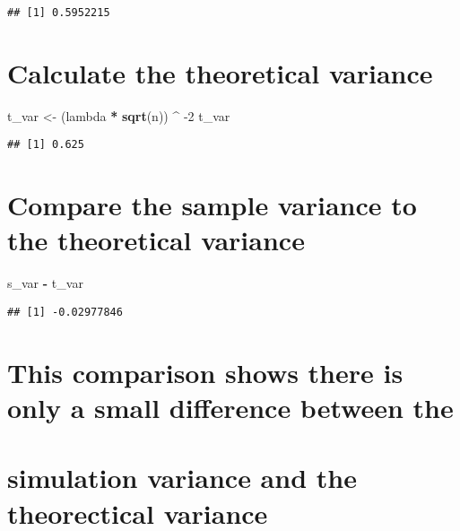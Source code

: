 \documentclass[
]{article}
\newenvironment{Shaded}{\begin{snugshade}}{\end{snugshade}}
\newcommand{\DecValTok}[1]{\textcolor[rgb]{0.00,0.00,0.81}{#1}}
\newcommand{\KeywordTok}[1]{\textcolor[rgb]{0.13,0.29,0.53}{\textbf{#1}}}
\newcommand{\NormalTok}[1]{#1}
\newcommand{\OperatorTok}[1]{\textcolor[rgb]{0.81,0.36,0.00}{\textbf{#1}}}
\newcommand{\StringTok}[1]{\textcolor[rgb]{0.31,0.60,0.02}{#1}}
\begin{document}
\begin{verbatim}
## [1] 0.5952215
\end{verbatim}

\hypertarget{calculate-the-theoretical-variance}{%
\section{Calculate the theoretical
variance}\label{calculate-the-theoretical-variance}}

\begin{Shaded}
\begin{Highlighting}[]
\NormalTok{t_var <-}\StringTok{ }\NormalTok{(lambda }\OperatorTok{*}\StringTok{ }\KeywordTok{sqrt}\NormalTok{(n)) }\OperatorTok{^}\StringTok{ }\DecValTok{-2}
\NormalTok{t_var}
\end{Highlighting}
\end{Shaded}

\begin{verbatim}
## [1] 0.625
\end{verbatim}

\hypertarget{compare-the-sample-variance-to-the-theoretical-variance}{%
\section{Compare the sample variance to the theoretical
variance}\label{compare-the-sample-variance-to-the-theoretical-variance}}

\begin{Shaded}
\begin{Highlighting}[]
\NormalTok{s_var }\OperatorTok{-}\StringTok{ }\NormalTok{t_var}
\end{Highlighting}
\end{Shaded}

\begin{verbatim}
## [1] -0.02977846
\end{verbatim}

\hypertarget{this-comparison-shows-there-is-only-a-small-difference-between-the}{%
\section{This comparison shows there is only a small difference between
the}\label{this-comparison-shows-there-is-only-a-small-difference-between-the}}

\hypertarget{simulation-variance-and-the-theorectical-variance}{%
\section{simulation variance and the theorectical
variance}\label{simulation-variance-and-the-theorectical-variance}}
\end{document}

